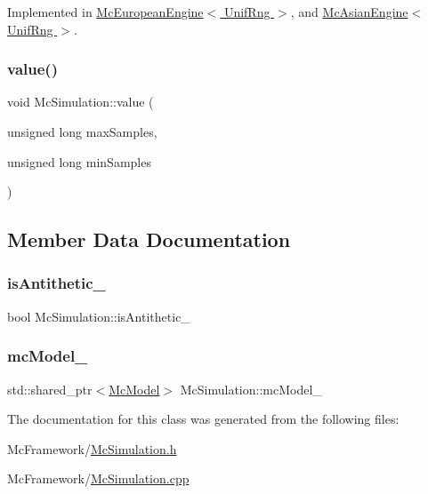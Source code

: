 Implemented in \hyperlink{class_mc_european_engine_a76252919552e4061795e30f30947a1ee}{Mc\+European\+Engine$<$ Unif\+Rng $>$}, and \hyperlink{class_mc_asian_engine_a4c16366e8dec7d689e934cbafe413332}{Mc\+Asian\+Engine$<$ Unif\+Rng $>$}.

\hypertarget{class_mc_simulation_a5f74044189f64941f7fd3aaa4acc8e8e}{}\label{class_mc_simulation_a5f74044189f64941f7fd3aaa4acc8e8e} 
\subsubsection{\texorpdfstring{value()}{value()}}
{\footnotesize\ttfamily void Mc\+Simulation\+::value (\begin{DoxyParamCaption}\item[{unsigned long}]{max\+Samples,  }\item[{unsigned long}]{min\+Samples }\end{DoxyParamCaption})}



\subsection{Member Data Documentation}
\hypertarget{class_mc_simulation_aabbb28856a126b01552583a571e1e807}{}\label{class_mc_simulation_aabbb28856a126b01552583a571e1e807} 
\subsubsection{\texorpdfstring{is\+Antithetic\+\_\+}{isAntithetic\_}}
{\footnotesize\ttfamily bool Mc\+Simulation\+::is\+Antithetic\+\_\+\hspace{0.3cm}{\ttfamily [private]}}

\hypertarget{class_mc_simulation_a7f6445b880401bcd208fd921ca8d82c2}{}\label{class_mc_simulation_a7f6445b880401bcd208fd921ca8d82c2} 
\subsubsection{\texorpdfstring{mc\+Model\+\_\+}{mcModel\_}}
{\footnotesize\ttfamily std\+::shared\+\_\+ptr$<$\hyperlink{class_mc_model}{Mc\+Model}$>$ Mc\+Simulation\+::mc\+Model\+\_\+\hspace{0.3cm}{\ttfamily [private]}}



The documentation for this class was generated from the following files\+:\begin{DoxyCompactItemize}
\item 
Mc\+Framework/\hyperlink{_mc_simulation_8h}{Mc\+Simulation.\+h}\item 
Mc\+Framework/\hyperlink{_mc_simulation_8cpp}{Mc\+Simulation.\+cpp}\end{DoxyCompactItemize}

